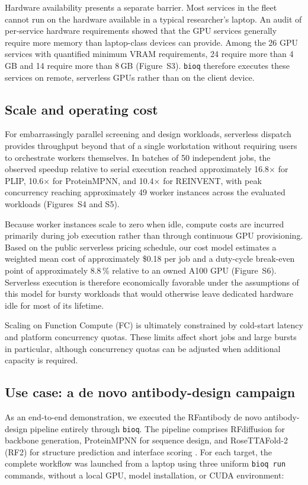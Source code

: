 \documentclass[webpdf,contemporary,large,namedate]{oup-authoring-template}%
\begin{document}
Hardware availability presents a separate barrier. Most services in
the fleet cannot run on the hardware available in a typical
researcher's laptop. An audit of per-service hardware requirements
showed that the GPU services generally require more memory than
laptop-class devices can provide. Among the 26 GPU services with
quantified minimum VRAM requirements, 24 require more than 4\,GB and
14 require more than 8\,GB (Figure~S3). \texttt{bioq} therefore
executes these services on remote, serverless GPUs rather than on the
client device.


\subsection{Scale and operating cost}\label{sec:scale}

For embarrassingly parallel screening and design workloads, serverless
dispatch provides throughput beyond that of a single workstation
without requiring users to orchestrate workers themselves. In batches
of 50 independent jobs, the observed speedup relative to serial
execution reached approximately 16.8$\times$ for PLIP,
10.6$\times$ for ProteinMPNN, and 10.4$\times$ for REINVENT, with
peak concurrency reaching approximately 49 worker instances across the
evaluated workloads (Figures~S4 and S5).

Because worker instances scale to zero when idle, compute costs are
incurred primarily during job execution rather than through continuous
GPU provisioning. Based on the public serverless pricing schedule, our
cost model estimates a weighted mean cost of approximately \$0.18 per
job and a duty-cycle break-even point of approximately 8.8\,\%
relative to an owned A100 GPU (Figure~S6). Serverless execution is
therefore economically favorable under the assumptions of this model
for bursty workloads that would otherwise leave dedicated hardware
idle for most of its lifetime.

Scaling on Function Compute (FC) is ultimately constrained by
cold-start latency and platform concurrency quotas. These limits affect
short jobs and large bursts in particular, although concurrency quotas
can be adjusted when additional capacity is required.


\subsection{Use case: a de novo antibody-design campaign}\label{sec:campaign}


As an end-to-end demonstration, we executed the RFantibody de novo
antibody-design pipeline entirely through \texttt{bioq}. The pipeline
comprises RFdiffusion for backbone generation, ProteinMPNN for
sequence design, and RoseTTAFold-2 (RF2) for structure prediction and
interface scoring \citep{bennett_atomically_2026}. For each target,
the complete workflow was launched from a laptop using three uniform
\texttt{bioq run} commands, without a local GPU, model installation,
or CUDA environment:
\end{document}
